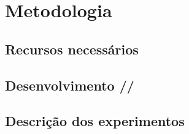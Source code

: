 \chapter{Metodologia}


\section{Recursos necessários}

\section{Desenvolvimento //}

\section{Descrição dos experimentos}